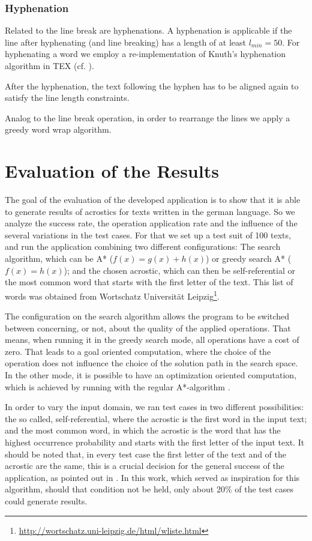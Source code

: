 \documentclass[11pt]{reportAlternative}
\begin{document}
\subsection{Hyphenation}
Related to the line break are hyphenations. A hyphenation is applicable if the line after hyphenating (and line breaking) has a length of at least $l_{min}=50$.
For hyphenating a word we employ a re-implementation of Knuth's hyphenation algorithm in TEX (cf. \cite{Hyphenation}).

After the hyphenation, the text following the hyphen has to be aligned again to satisfy the line length constraints.

Analog to the line break operation, in order to rearrange the lines we apply a greedy word wrap algorithm.

\chapter{Evaluation of the Results}
The goal of the evaluation of the developed application is to show that it is able to generate results of acrostics for texts written in the german language. So we analyze the success rate, the operation application rate and the influence of the several variations in the test cases. For that we set up a test suit of 100 texts, and run the application combining two different configurations: The search algorithm, which can be A* ($f(x) = g(x) + h(x)$) or greedy search A* ($f(x) = h(x)$); and the chosen acrostic, which can then be self-referential or the most common word that starts with the first letter of the text. This list of words was obtained from Wortschatz Universität Leipzig\footnote{\url{http://wortschatz.uni-leipzig.de/html/wliste.html}}.

The configuration on the search algorithm allows the program to be switched between concerning, or not, about the quality of the applied operations. That means, when running it in the greedy search mode, all operations have a cost of zero. That leads to a goal oriented computation, where the choice of the operation does not influence the choice of the solution path in the search space. In the other mode, it is possible to have an optimization oriented computation, which is achieved by running with the regular A*-algorithm \cite{AStar}.

In order to vary the input domain, we ran test cases in two different possibilities: the so called, self-referential, where the acrostic is the first word in the input text; and the most common word, in which the acrostic is the word that has the highest occurrence probability and starts with the first letter of the input text. It should be noted that, in every test case the first letter of the text and of the acrostic are the same, this is a crucial decision for the general success of the application, as pointed out in \cite{Stein}. In this work, which served as inspiration for this algorithm, should that condition not be held, only about 20\% of the test cases could generate results.
\end{document}
